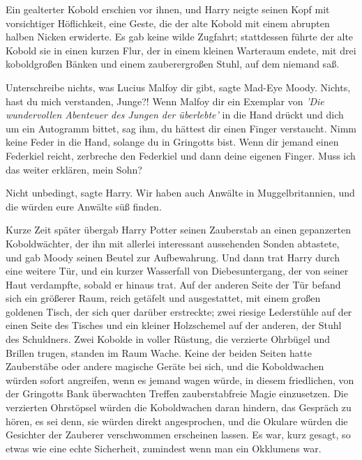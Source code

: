 Ein gealterter Kobold erschien vor ihnen, und Harry neigte seinen Kopf mit
vorsichtiger Höflichkeit, eine Geste, die der alte Kobold mit einem abrupten
halben Nicken erwiderte. Es gab keine wilde Zugfahrt; stattdessen führte der
alte Kobold sie in einen kurzen Flur, der in einem kleinen Warteraum endete, mit
drei koboldgroßen Bänken und einem zauberergroßen Stuhl, auf dem niemand saß.

\glqq Unterschreibe nichts, was Lucius Malfoy dir gibt\grqq{}, sagte Mad-Eye
Moody. \glqq Nichts, hast du mich verstanden, Junge?! Wenn Malfoy dir ein
Exemplar von\emph{ 'Die wundervollen Abenteuer des Jungen der überlebte'} in die
Hand drückt und dich um ein Autogramm bittet, sag ihm, du hättest dir einen
Finger verstaucht. Nimm keine Feder in die Hand, solange du in Gringotts bist.
Wenn dir jemand einen Federkiel reicht, zerbreche den Federkiel und dann deine
eigenen Finger. Muss ich das weiter erklären, mein Sohn?\grqq{}

\glqq Nicht unbedingt\grqq{}, sagte Harry. \glqq Wir haben auch Anwälte in
Muggelbritannien, und die würden eure Anwälte süß finden.\grqq{}

Kurze Zeit später übergab Harry Potter seinen Zauberstab an einen gepanzerten
Koboldwächter, der ihn mit allerlei interessant aussehenden Sonden abtastete,
und gab Moody seinen Beutel zur Aufbewahrung. Und dann trat Harry durch eine
weitere Tür, und ein kurzer Wasserfall von Diebesuntergang, der von seiner Haut
verdampfte, sobald er hinaus trat. Auf der anderen Seite der Tür befand sich ein
größerer Raum, reich getäfelt und ausgestattet, mit einem großen goldenen Tisch,
der sich quer darüber erstreckte; zwei riesige Lederstühle auf der einen Seite
des Tisches und ein kleiner Holzschemel auf der anderen, der Stuhl des
Schuldners. Zwei Kobolde in voller Rüstung, die verzierte Ohrbügel und Brillen
trugen, standen im Raum Wache. Keine der beiden Seiten hatte Zauberstäbe oder
andere magische Geräte bei sich, und die Koboldwachen würden sofort angreifen,
wenn es jemand wagen würde, in diesem friedlichen, von der Gringotts Bank
überwachten Treffen zauberstabfreie Magie einzusetzen. Die verzierten Ohrstöpsel
würden die Koboldwachen daran hindern, das Gespräch zu hören, es sei denn, sie
würden direkt angesprochen, und die Okulare würden die Gesichter der Zauberer
verschwommen erscheinen lassen. Es war, kurz gesagt, so etwas wie eine echte
Sicherheit, zumindest wenn man ein Okklumens war.

